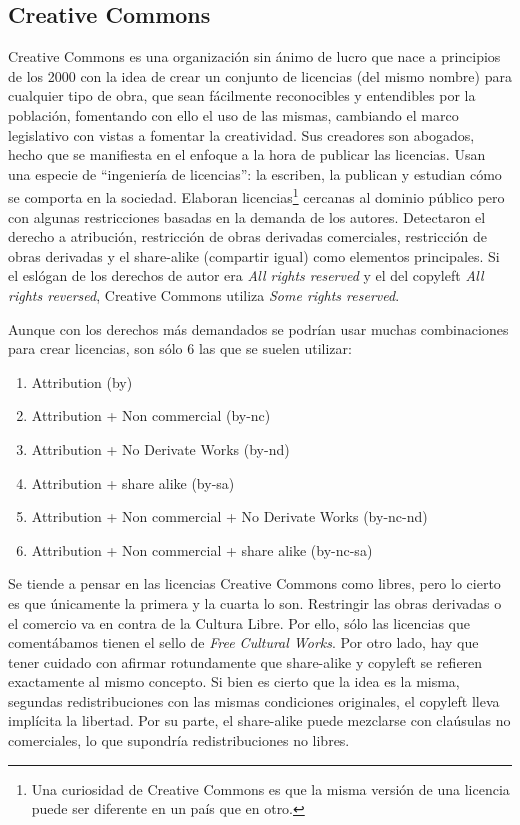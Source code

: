 \subsection{Creative Commons}
\label{sub:creative}
Creative Commons es una organización sin ánimo de lucro que nace a principios de
los 2000 con la idea de crear un conjunto de licencias (del mismo nombre) para
cualquier tipo de obra, que sean fácilmente reconocibles y entendibles por la
población, fomentando con ello el uso de las mismas, cambiando el marco
legislativo con vistas a fomentar la creatividad. Sus creadores son abogados,
hecho que se manifiesta en el enfoque a la hora de publicar las licencias. Usan
una especie de ``ingeniería de licencias'': la escriben, la publican y estudian
cómo se comporta en la sociedad. Elaboran licencias\footnote{Una curiosidad
  de Creative Commons es que la misma versión de una licencia puede
  ser diferente en un país que en otro.} cercanas al dominio público
pero con algunas restricciones basadas en la demanda de los
autores. Detectaron el derecho a atribución, restricción de obras
derivadas comerciales, restricción de obras derivadas y el share-alike
(compartir igual) como elementos principales. Si el eslógan de los
derechos de autor era \emph{All rights reserved} y el del copyleft
\emph{All rights reversed}, Creative Commons utiliza \emph{Some rights
  reserved}.

Aunque con los derechos más demandados se podrían usar muchas
combinaciones para crear licencias, son sólo 6 las que se suelen
utilizar:
\begin{enumerate}
\item Attribution (by)
\item Attribution + Non commercial (by-nc)
\item Attribution + No Derivate Works (by-nd)
\item Attribution + share alike (by-sa)
\item Attribution + Non commercial + No Derivate Works (by-nc-nd)
\item Attribution + Non commercial + share alike (by-nc-sa)
\end{enumerate}
Se tiende a pensar en las licencias Creative Commons como libres, pero
lo cierto es que únicamente la primera y la cuarta lo son. Restringir
las obras derivadas o el comercio va en contra de la Cultura
Libre. Por ello, sólo las licencias que comentábamos tienen el sello
de \emph{Free Cultural Works}. Por otro lado, hay que tener cuidado
con afirmar rotundamente que share-alike y copyleft se refieren
exactamente al mismo concepto. Si bien es cierto que la idea es la
misma, segundas redistribuciones con las mismas condiciones
originales, el copyleft lleva implícita la libertad. Por su parte, el
share-alike puede mezclarse con claúsulas no comerciales, lo que
supondría redistribuciones no libres.

